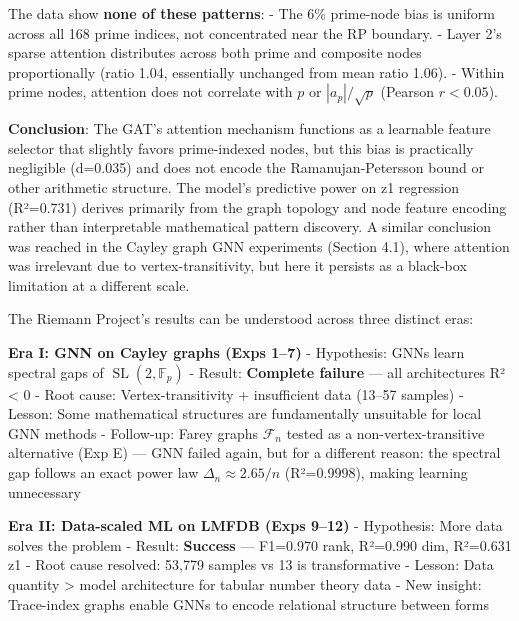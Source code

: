 \documentclass[
]{article}
\begin{document}
The data show \textbf{none of these patterns}: - The 6\% prime-node bias
is uniform across all 168 prime indices, not concentrated near the RP
boundary. - Layer 2's sparse attention distributes across both prime and
composite nodes proportionally (ratio 1.04, essentially unchanged from
mean ratio 1.06). - Within prime nodes, attention does not correlate
with \(p\) or \(|a_p|/\sqrt{p}\) (Pearson \(r < 0.05\)).

\textbf{Conclusion}: The GAT's attention mechanism functions as a
learnable feature selector that slightly favors prime-indexed nodes, but
this bias is practically negligible (d=0.035) and does not encode the
Ramanujan-Petersson bound or other arithmetic structure. The model's
predictive power on z1 regression (R²=0.731) derives primarily from the
graph topology and node feature encoding rather than interpretable
mathematical pattern discovery. A similar conclusion was reached in the
Cayley graph GNN experiments (Section 4.1), where attention was
irrelevant due to vertex-transitivity, but here it persists as a
black-box limitation at a different scale.

The Riemann Project's results can be understood across three distinct
eras:

\textbf{Era I: GNN on Cayley graphs (Exps 1--7)} - Hypothesis: GNNs
learn spectral gaps of \(\operatorname{SL}(2,\mathbb{F}_p)\) - Result:
\textbf{Complete failure} --- all architectures R² \textless{} 0 - Root
cause: Vertex-transitivity + insufficient data (13--57 samples) -
Lesson: Some mathematical structures are fundamentally unsuitable for
local GNN methods - Follow-up: Farey graphs \(\mathcal{F}_n\) tested as
a non-vertex-transitive alternative (Exp E) --- GNN failed again, but
for a different reason: the spectral gap follows an exact power law
\(\Delta_n \approx 2.65/n\) (R²=0.9998), making learning unnecessary

\textbf{Era II: Data-scaled ML on LMFDB (Exps 9--12)} - Hypothesis: More
data solves the problem - Result: \textbf{Success} --- F1=0.970 rank,
R²=0.990 dim, R²=0.631 z1 - Root cause resolved: 53,779 samples vs 13 is
transformative - Lesson: Data quantity \textgreater{} model architecture
for tabular number theory data - New insight: Trace-index graphs enable
GNNs to encode relational structure between forms
\end{document}

